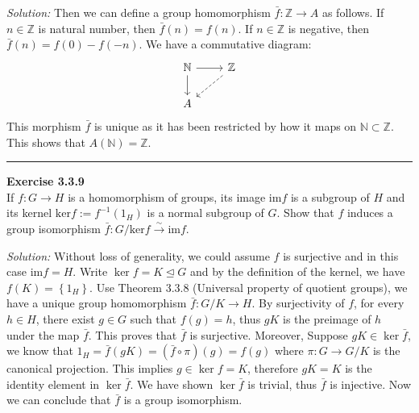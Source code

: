 \documentclass[a4paper, 11pt]{article}
\newenvironment{problem}[2][Exercise]
    { \begin{mdframed}[backgroundcolor=gray!20] \textbf{#1 #2} \\}
    {  \end{mdframed}}
\newenvironment{solution}
    {\textit{Solution:}}
    {}
\begin{document}
\begin{solution}
Then we can define a group homomorphism \(\bar{f}:\mathbb{Z}\rightarrow A\) as follows. If \(n\in \mathbb{Z}\) is natural number, then \(\bar{f}(n)=f(n)\). If \(n\in \mathbb{Z}\) is negative, then \(\bar{f}(n)=f(0)-f(-n)\). We have a commutative diagram: 
$$\begin{tikzcd}
	{\mathbb{N}} & {\mathbb{Z}} \\
	A
	\arrow[from=1-1, to=1-2]
	\arrow[from=1-1, to=2-1]
	\arrow[dashed, from=1-2, to=2-1]
\end{tikzcd}$$
This morphism \(\bar{f}\) is unique as it has been restricted by how it maps on \(\mathbb{N}\subset \mathbb{Z}\). This shows that \(A(\mathbb{N})=\mathbb{Z}\). 

\end{solution}

\noindent\rule{7in}{2.8pt}
\begin{problem}{3.3.9}
If \(f:G\rightarrow H\) is a homomorphism of groups, its image \(\text{im}f\) is a subgroup of \(H\) and its kernel \(\text{ker}f:=f^{-1}(1_H)\) is a normal 
subgroup of \(G\). Show that \(f\) induces a group isomorphism \(\bar{f}:G/\text{ker}f\xrightarrow{\sim} \text{im}f\).
\end{problem}
\begin{solution}
Without loss of generality, we could assume \(f\) is surjective and in this case \(\text{im}f=H\). Write \(\ker f=K\unlhd G\) and by the definition of the kernel, we have 
\(f(K)=\left\{ 1_H \right\}\). Use Theorem 3.3.8 (Universal property of quotient groups), we have a unique group homomorphism \(\bar{f}:G/K\rightarrow H\). By surjectivity of \(f\), for 
every \(h\in H\), there exist \(g\in G\) such that \(f(g)=h\), thus \(gK\) is the preimage of \(h\) under the map \(\bar{f}\). This proves that \(\bar{f}\) is surjective. Moreover, 
Suppose \(gK\in \ker \bar{f}\), we know that \(1_H=\bar{f}(gK)=(\bar{f}\circ \pi)(g)=f(g)\) where \(\pi:G\rightarrow G/K\) is the canonical projection. This implies \(g\in \ker f=K\), therefore \(gK=K\) is the 
identity element in \(\ker \bar{f}\). We have shown \(\ker \bar{f}\) is trivial, thus \(\bar{f}\) is injective. Now we can conclude that \(\bar{f}\) is a group isomorphism.
\end{solution}
\end{document}
